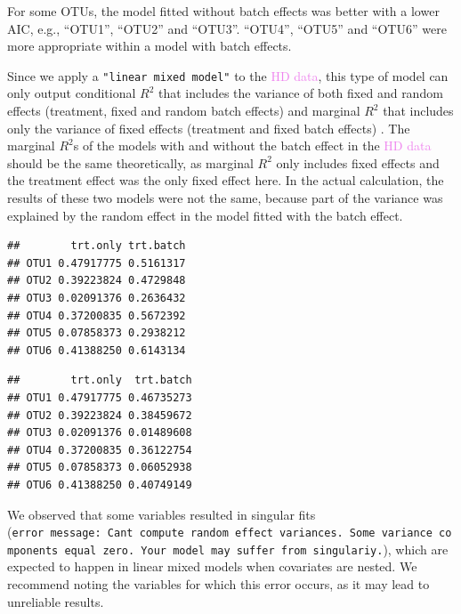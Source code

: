 \documentclass[
]{book}
\newenvironment{Shaded}{\begin{snugshade}}{\end{snugshade}}
\newcommand{\FunctionTok}[1]{\textcolor[rgb]{0.00,0.00,0.00}{#1}}
\newcommand{\NormalTok}[1]{#1}
\newcommand{\SpecialCharTok}[1]{\textcolor[rgb]{0.00,0.00,0.00}{#1}}
\begin{document}
For some OTUs, the model fitted without batch effects was better with a lower AIC, e.g., ``OTU1'', ``OTU2'' and ``OTU3''. ``OTU4'', ``OTU5'' and ``OTU6'' were more appropriate within a model with batch effects.

Since we apply a \texttt{"linear\ mixed\ model"} to the \textcolor{violet}{HD data}, this type of model can only output conditional \(R^2\) that includes the variance of both fixed and random effects (treatment, fixed and random batch effects) and marginal \(R^2\) that includes only the variance of fixed effects (treatment and fixed batch effects) \citep{nakagawa2013general}. The marginal \(R^2\)s of the models with and without the batch effect in the \textcolor{violet}{HD data} should be the same theoretically, as marginal \(R^2\) only includes fixed effects and the treatment effect was the only fixed effect here. In the actual calculation, the results of these two models were not the same, because part of the variance was explained by the random effect in the model fitted with the batch effect.

\begin{Shaded}
\end{Shaded}

\begin{verbatim}
##        trt.only trt.batch
## OTU1 0.47917775 0.5161317
## OTU2 0.39223824 0.4729848
## OTU3 0.02091376 0.2636432
## OTU4 0.37200835 0.5672392
## OTU5 0.07858373 0.2938212
## OTU6 0.41388250 0.6143134
\end{verbatim}

\begin{Shaded}
\end{Shaded}

\begin{verbatim}
##        trt.only  trt.batch
## OTU1 0.47917775 0.46735273
## OTU2 0.39223824 0.38459672
## OTU3 0.02091376 0.01489608
## OTU4 0.37200835 0.36122754
## OTU5 0.07858373 0.06052938
## OTU6 0.41388250 0.40749149
\end{verbatim}

We observed that some variables resulted in singular fits (\texttt{error\ message:\ Can\textquotesingle{}t\ compute\ random\ effect\ variances.\ Some\ variance\ components\ equal\ zero.\ Your\ model\ may\ suffer\ from\ singulariy.}), which are expected to happen in linear mixed models when covariates are nested. We recommend noting the variables for which this error occurs, as it may lead to unreliable results.
\end{document}
